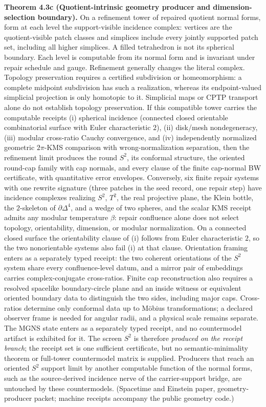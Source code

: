 \textbf{Theorem 4.3c (Quotient-intrinsic geometry producer and dimension-selection boundary).} On a refinement tower of repaired quotient normal forms, form at each level the support-visible incidence complex: vertices are the quotient-visible patch classes and simplices include every jointly supported patch set, including all higher simplices. A filled tetrahedron is not its spherical boundary. Each level is computable from its normal form and is invariant under repair schedule and gauge. Refinement generally changes the literal complex. Topology preservation requires a certified subdivision or homeomorphism: a complete midpoint subdivision has such a realization, whereas its endpoint-valued simplicial projection is only homotopic to it. Simplicial maps or CPTP transport alone do not establish topology preservation. If this compatible tower carries the computable receipts (i) spherical incidence (connected closed orientable combinatorial surface with Euler characteristic \(2\)), (ii) disk/mesh nondegeneracy, (iii) modular cross-ratio Cauchy convergence, and (iv) independently normalized geometric \(2\pi\)-KMS comparison with wrong-normalization separation, then the refinement limit produces the round \(S^2\), its conformal structure, the oriented round-cap family with cap normals, and every clause of the finite cap-normal BW certificate, with quantitative error envelopes. Conversely, six finite repair systems with one rewrite signature (three patches in the seed record, one repair step) have incidence complexes realizing \(S^2\), \(T^2\), the real projective plane, the Klein bottle, the \(2\)-skeleton of \(\partial\Delta^4\), and a wedge of two spheres, and the scalar KMS receipt admits any modular temperature \(\beta\): repair confluence alone does not select topology, orientability, dimension, or modular normalization. On a connected closed surface the orientability clause of (i) follows from Euler characteristic \(2\), so the two nonorientable systems also fail (i) at that clause. Orientation framing enters as a separately typed receipt: the two coherent orientations of the \(S^2\) system share every confluence-level datum, and a mirror pair of embeddings carries complex-conjugate cross-ratios. Finite cap reconstruction also requires a resolved spacelike boundary-circle plane and an inside witness or equivalent oriented boundary data to distinguish the two sides, including major caps. Cross-ratios determine only conformal data up to M\"obius transformations; a declared observer frame is needed for angular radii, and a physical scale remains separate. The MGNS state enters as a separately typed receipt, and no countermodel artifact is exhibited for it. The screen \(S^2\) is therefore \emph{produced on the receipt branch}; the receipt set is one sufficient certificate, but no semantic-minimality theorem or full-tower countermodel matrix is supplied. Producers that reach an oriented \(S^2\) support limit by another computable function of the normal forms, such as the source-derived incidence nerve of the carrier-support bridge, are untouched by these countermodels. (Spacetime and Einstein paper, geometry-producer packet; machine receipts accompany the public geometry code.)

